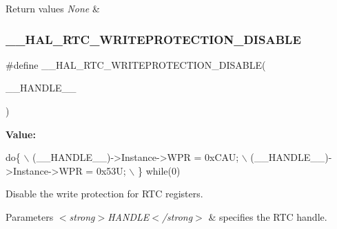 \begin{DoxyRetVals}{Return values}
{\em None} & \\
\hline
\end{DoxyRetVals}
\mbox{\label{group___r_t_c___exported___macros_gae150645fb78c1d175b9e0f88fc3f4ad4}} 
\subsubsection{\texorpdfstring{\+\_\+\+\_\+\+H\+A\+L\+\_\+\+R\+T\+C\+\_\+\+W\+R\+I\+T\+E\+P\+R\+O\+T\+E\+C\+T\+I\+O\+N\+\_\+\+D\+I\+S\+A\+B\+LE}{\_\_HAL\_RTC\_WRITEPROTECTION\_DISABLE}}
{\footnotesize\ttfamily \#define \+\_\+\+\_\+\+H\+A\+L\+\_\+\+R\+T\+C\+\_\+\+W\+R\+I\+T\+E\+P\+R\+O\+T\+E\+C\+T\+I\+O\+N\+\_\+\+D\+I\+S\+A\+B\+LE(\begin{DoxyParamCaption}\item[{}]{\+\_\+\+\_\+\+H\+A\+N\+D\+L\+E\+\_\+\+\_\+ }\end{DoxyParamCaption})}

{\bfseries Value\+:}
\begin{DoxyCode}
\textcolor{keywordflow}{do}\{                                       \(\backslash\)
                            (\_\_HANDLE\_\_)->Instance->WPR = 0xCAU;   \(\backslash\)
                            (\_\_HANDLE\_\_)->Instance->WPR = 0x53U;   \(\backslash\)
                          \} \textcolor{keywordflow}{while}(0)
\end{DoxyCode}


Disable the write protection for R\+TC registers. 


\begin{DoxyParams}{Parameters}
{\em $<$strong$>$\+H\+A\+N\+D\+L\+E$<$/strong$>$} & specifies the R\+TC handle. \\
\hline
\end{DoxyParams}

